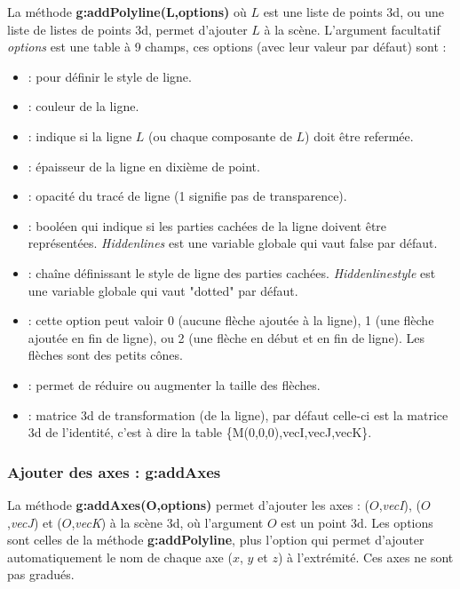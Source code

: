 La méthode \textbf{g:addPolyline(L,options)} où $L$ est une liste de points 3d, ou une liste de listes de points 3d, permet d'ajouter $L$ à la scène. L'argument facultatif \emph{options} est une table à 9 champs, ces options (avec leur valeur par défaut) sont :
    \begin{itemize}
        \item {} : pour définir le style de ligne.
        \item {} : couleur de la ligne.
        \item {} : indique si la ligne $L$ (ou chaque composante de $L$) doit être refermée.
        \item {} : épaisseur de la ligne en dixième de point.
        \item {} : opacité du tracé de ligne (1 signifie pas de transparence).
        \item {} : booléen qui indique si les parties cachées de la ligne doivent être représentées. \emph{Hiddenlines} est une variable globale qui vaut false par défaut.
        \item {} : chaîne définissant le style de ligne des parties cachées. \emph{Hiddenlinestyle} est une variable globale qui vaut "dotted" par défaut.
        \item {} : cette option peut valoir 0 (aucune flèche ajoutée à la ligne), 1 (une flèche ajoutée en fin de ligne), ou 2 (une flèche en début et en fin de ligne). Les flèches sont des petits cônes.
        \item {} : permet de réduire ou augmenter la taille des flèches.
        \item {} : matrice 3d de transformation (de la ligne), par défaut celle-ci est la matrice 3d de l'identité, c'est à dire la table \{M(0,0,0),vecI,vecJ,vecK\}.
    \end{itemize}
    
\subsubsection{Ajouter des axes : g:addAxes}

La méthode \textbf{g:addAxes(O,options)} permet d'ajouter les axes : ($O$,\emph{vecI}), ($O$,\emph{vecJ}) et ($O$,\emph{vecK}) à la scène 3d, où l'argument $O$ est un point 3d. Les options sont celles de la méthode \textbf{g:addPolyline}, plus l'option  qui permet d'ajouter automatiquement le nom de chaque axe ($x$, $y$ et $z$) à l'extrémité. Ces axes ne sont pas gradués.
    
